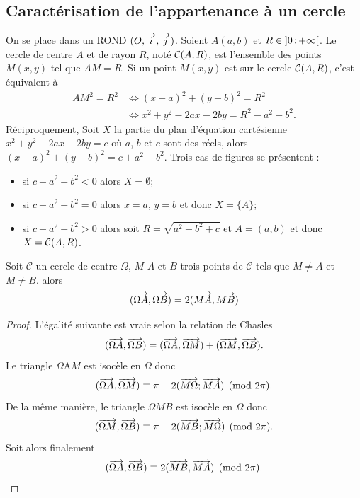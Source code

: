\subsection{Caractérisation de l'appartenance à un cercle}
\label{sec:caractcercle}
On se place dans un ROND $(O,\overrightarrow{i},\overrightarrow{j})$. Soient $A(a,b)$ et $R \in \left] 0 \, ;  +\infty \right[$. Le cercle de centre $A$ et de rayon $R$, noté $\mathcal{C}(A,R)$, est l'ensemble des points $M(x,y)$ tel que $AM=R$. Si un point $M(x,y)$ est sur le cercle $\mathcal{C}(A,R)$, c'est équivalent à
\begin{align}
  AM^2=R^2 & \iff (x-a)^2+(y-b)^2=R^2\\
&\iff x^2+y^2-2ax-2by=R^2-a^2-b^2.
\end{align}
Réciproquement, Soit $X$ la partie du plan d'équation cartésienne $x^2+y^2-2ax-2by=c$ où $a$, $b$ et $c$ sont des réels, alors $(x-a)^2+(y-b)^2=c+a^2+b^2$. Trois cas de figures se présentent :
\begin{itemize}
\item si $c+a^2+b^2<0$ alors $X=\emptyset$;
\item si $c+a^2+b^2=0$ alors $x=a$, $y=b$ et donc $X=\{A\}$;
\item si $c+a^2+b^2>0$ alors soit $R=\sqrt{a^2+b^2+c}$ et $A=(a,b)$ et donc $X=\mathcal{C}(A,R)$.
\end{itemize}
\begin{prop}
  \label{prop:cocy}
  Soit $\mathcal{C}$ un cercle de centre $\Omega$, $M$ $A$ et $B$ trois points de $\mathcal{C}$ tels que $M \neq A$ et $M \neq B$. alors 
  \begin{equation}
    (\overrightarrow{\Omega A},\overrightarrow{\Omega B})=2 (\overrightarrow{MA},\overrightarrow{MB})
  \end{equation}
\end{prop}
\begin{proof}
  L'égalité suivante est vraie selon la relation de Chasles
  \begin{equation}
    (\overrightarrow{\Omega A},\overrightarrow{\Omega B}) = (\overrightarrow{\Omega A},\overrightarrow{\Omega M}) + (\overrightarrow{\Omega M},\overrightarrow{\Omega B}).
  \end{equation}
  Le triangle $\Omega $A$ M$ est isocèle en $\Omega$ donc
  \begin{equation}
    (\overrightarrow{\Omega A}, \overrightarrow{\Omega M}) \equiv \pi - 2 (\overrightarrow{M\Omega}; \overrightarrow{MA}) \pmod {2\pi}.
  \end{equation}
  De la même manière, le triangle $\Omega M B$ est isocèle en $\Omega$ donc
  \begin{equation}
    (\overrightarrow{\Omega M}, \overrightarrow{\Omega B}) \equiv \pi - 2 (\overrightarrow{MB}; \overrightarrow{M\Omega}) \pmod {2\pi}.
  \end{equation}
  Soit alors finalement 
  \begin{equation}
    (\overrightarrow{\Omega A}, \overrightarrow{\Omega B}) \equiv 2 (\overrightarrow{MB}, \overrightarrow{MA}) \pmod {2\pi}.
\end{equation}
\end{proof}
